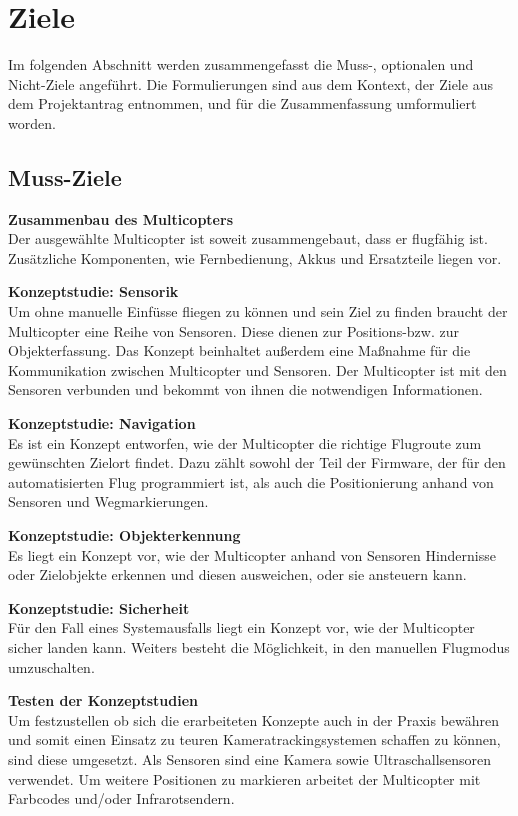 \section{Ziele}
Im folgenden Abschnitt werden zusammengefasst die Muss-, optionalen und Nicht-Ziele angeführt.
Die Formulierungen sind aus dem Kontext, der Ziele aus dem Projektantrag entnommen, und für die
Zusammenfassung umformuliert worden.

  \subsection{Muss-Ziele}
  \textbf{Zusammenbau des Multicopters}\\
  Der ausgewählte Multicopter ist soweit zusammengebaut, dass er flugfähig ist.
  Zusätzliche Komponenten, wie Fernbedienung, Akkus und Ersatzteile liegen vor.

  \textbf{Konzeptstudie: Sensorik}\\
  Um ohne manuelle Einfüsse fliegen zu können und sein Ziel zu finden braucht der Multicopter eine Reihe
  von Sensoren. Diese dienen zur Positions-bzw. zur Objekterfassung. Das Konzept beinhaltet außerdem eine
  Maßnahme für die Kommunikation zwischen Multicopter und Sensoren.
  Der Multicopter ist mit den Sensoren verbunden und bekommt von ihnen die notwendigen Informationen.

  \textbf{Konzeptstudie: Navigation}\\
  Es ist ein Konzept entworfen, wie der Multicopter die richtige Flugroute zum gewünschten
  Zielort findet. Dazu zählt sowohl der Teil der Firmware, der für den automatisierten Flug programmiert ist,
  als auch die Positionierung anhand von Sensoren und Wegmarkierungen.

  \textbf{Konzeptstudie: Objekterkennung}\\
  Es liegt ein Konzept vor, wie der Multicopter anhand von Sensoren Hindernisse oder Zielobjekte
  erkennen und diesen ausweichen, oder sie ansteuern kann.

  \textbf{Konzeptstudie: Sicherheit}\\
  Für den Fall eines Systemausfalls liegt ein Konzept vor, wie der Multicopter sicher landen kann.
  Weiters besteht die Möglichkeit, in den manuellen Flugmodus umzuschalten.

  \textbf{Testen der Konzeptstudien}\\
  Um festzustellen ob sich die erarbeiteten Konzepte auch in der Praxis bewähren und somit einen Einsatz zu
  teuren Kameratrackingsystemen schaffen zu können, sind diese umgesetzt. Als Sensoren sind eine Kamera
  sowie Ultraschallsensoren verwendet. Um weitere Positionen zu markieren arbeitet der Multicopter mit
  Farbcodes und/oder Infrarotsendern.

